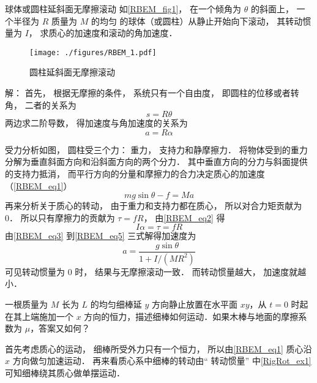 \begin{example}{球体或圆柱延斜面无摩擦滚动}\label{RBEM_ex1}
如\autoref{RBEM_fig1}， 在一个倾角为 $\theta$ 的斜面上， 一个半径为 $R$ 质量为 $M$ 的均匀 的球体（或圆柱）从静止开始向下滚动， 其转动惯量为 $I$， 求质心的加速度和滚动的角加速度．

\begin{figure}[ht]
\centering
\texttt{[image: ./figures/RBEM\_1.pdf]}
\caption{圆柱延斜面无摩擦滚动} \label{RBEM_fig1}
\end{figure}

解： 首先， 根据无摩擦的条件， 系统只有一个自由度， 即圆柱的位移或者转角， 二者的关系为
\begin{equation}
s = R\theta
\end{equation}
两边求二阶导数， 得加速度与角加速度的关系为
\begin{equation}\label{RBEM_eq3}
a = R\alpha
\end{equation}

受力分析如图， 圆柱受三个力： 重力， 支持力和静摩擦力． 将物体受到的重力分解为垂直斜面方向和沿斜面方向的两个分力． 其中垂直方向的分力与斜面提供的支持力抵消， 而平行方向的分量和摩擦力的合力决定质心的加速度（\autoref{RBEM_eq1}）
\begin{equation}\label{RBEM_eq4}
mg\sin\theta - f = Ma
\end{equation}
再来分析关于质心的转动， 由于重力和支持力都在质心， 所以对合力矩贡献为 0． 所以只有摩擦力的贡献为 $\tau = fR$， 由\autoref{RBEM_eq2} 得
\begin{equation}\label{RBEM_eq5}
I\alpha = \tau = f R
\end{equation}
由\autoref{RBEM_eq3} 到\autoref{RBEM_eq5} 三式解得加速度为
\begin{equation}
a = \frac{g \sin\theta}{1 + I/(MR^2)}
\end{equation}
可见转动惯量为 0 时， 结果与无摩擦滚动一致． 而转动惯量越大， 加速度就越小．
\end{example}

\begin{example}{}
一根质量为 $M$ 长为 $L$ 的均匀细棒延 $y$ 方向静止放置在水平面 $xy$，从 $t=0$ 时起在其上端施加一个 $x$ 方向的恒力，描述细棒如何运动．如果木棒与地面的摩擦系数为 $\mu$，答案又如何？

首先考虑质心的运动， 细棒所受外力只有一个恒力， 所以由\autoref{RBEM_eq1} 质心沿 $x$ 方向做匀加速运动． 再来看质心系中细棒的转动由“ 转动惯量” 中\autoref{RigRot_ex1} 可知细棒绕其质心做单摆运动．
\end{example}
